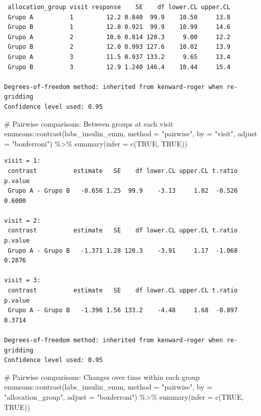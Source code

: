\documentclass[
  letterpaper,
  DIV=11,
  numbers=noendperiod]{scrartcl}
\newenvironment{Shaded}{\begin{snugshade}}{\end{snugshade}}
\newcommand{\AttributeTok}[1]{\textcolor[rgb]{0.40,0.45,0.13}{#1}}
\newcommand{\CommentTok}[1]{\textcolor[rgb]{0.37,0.37,0.37}{#1}}
\newcommand{\ConstantTok}[1]{\textcolor[rgb]{0.56,0.35,0.01}{#1}}
\newcommand{\FunctionTok}[1]{\textcolor[rgb]{0.28,0.35,0.67}{#1}}
\newcommand{\NormalTok}[1]{\textcolor[rgb]{0.00,0.23,0.31}{#1}}
\newcommand{\SpecialCharTok}[1]{\textcolor[rgb]{0.37,0.37,0.37}{#1}}
\newcommand{\StringTok}[1]{\textcolor[rgb]{0.13,0.47,0.30}{#1}}
\begin{document}
\begin{verbatim}
 allocation_group visit response    SE    df lower.CL upper.CL
 Grupo A          1         12.2 0.840  99.9    10.50     13.8
 Grupo B          1         12.8 0.921  99.9    10.99     14.6
 Grupo A          2         10.6 0.814 120.3     9.00     12.2
 Grupo B          2         12.0 0.993 127.6    10.02     13.9
 Grupo A          3         11.5 0.937 133.2     9.65     13.4
 Grupo B          3         12.9 1.240 146.4    10.44     15.4

Degrees-of-freedom method: inherited from kenward-roger when re-gridding 
Confidence level used: 0.95 
\end{verbatim}

\begin{Shaded}
\begin{Highlighting}[]
\CommentTok{\# Pairwise comparisons: Between groups at each visit}
\NormalTok{emmeans}\SpecialCharTok{::}\FunctionTok{contrast}\NormalTok{(labs\_insulin\_emm, }\AttributeTok{method =} \StringTok{"pairwise"}\NormalTok{, }\AttributeTok{by =} \StringTok{"visit"}\NormalTok{, }\AttributeTok{adjust =} \StringTok{"bonferroni"}\NormalTok{) }\SpecialCharTok{\%\textgreater{}\%} \FunctionTok{summary}\NormalTok{(}\AttributeTok{infer =} \FunctionTok{c}\NormalTok{(}\ConstantTok{TRUE}\NormalTok{, }\ConstantTok{TRUE}\NormalTok{))}
\end{Highlighting}
\end{Shaded}

\begin{verbatim}
visit = 1:
 contrast          estimate   SE    df lower.CL upper.CL t.ratio p.value
 Grupo A - Grupo B   -0.656 1.25  99.9    -3.13     1.82  -0.526  0.6000

visit = 2:
 contrast          estimate   SE    df lower.CL upper.CL t.ratio p.value
 Grupo A - Grupo B   -1.371 1.28 120.3    -3.91     1.17  -1.068  0.2876

visit = 3:
 contrast          estimate   SE    df lower.CL upper.CL t.ratio p.value
 Grupo A - Grupo B   -1.396 1.56 133.2    -4.48     1.68  -0.897  0.3714

Degrees-of-freedom method: inherited from kenward-roger when re-gridding 
Confidence level used: 0.95 
\end{verbatim}

\begin{Shaded}
\begin{Highlighting}[]
\CommentTok{\# Pairwise comparisons: Changes over time within each group}
\NormalTok{emmeans}\SpecialCharTok{::}\FunctionTok{contrast}\NormalTok{(labs\_insulin\_emm, }\AttributeTok{method =} \StringTok{"pairwise"}\NormalTok{, }\AttributeTok{by =} \StringTok{"allocation\_group"}\NormalTok{, }\AttributeTok{adjust =} \StringTok{"bonferroni"}\NormalTok{) }\SpecialCharTok{\%\textgreater{}\%} \FunctionTok{summary}\NormalTok{(}\AttributeTok{infer =} \FunctionTok{c}\NormalTok{(}\ConstantTok{TRUE}\NormalTok{, }\ConstantTok{TRUE}\NormalTok{))}
\end{Highlighting}
\end{Shaded}
\end{document}
